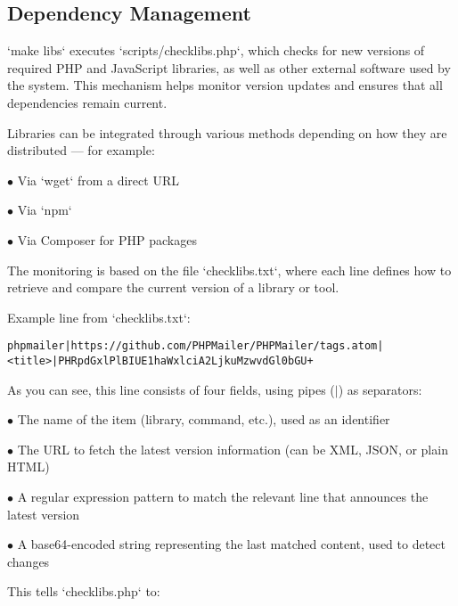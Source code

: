 \documentclass[a4paper]{article}
\begin{document}
\hypertarget{toc63}{}
\subsection{Dependency Management}

`make libs` executes `scripts/checklibs.php`, which checks for new versions of required PHP and JavaScript libraries, as well as other external software used by the system. This mechanism helps monitor version updates and ensures that all dependencies remain current.

Libraries can be integrated through various methods depending on how they are distributed — for example:

\begin{compactitem}
\item[\color{myblue}$\bullet$] Via `wget` from a direct URL
\item[\color{myblue}$\bullet$] Via `npm`
\item[\color{myblue}$\bullet$] Via Composer for PHP packages
\end{compactitem}

The monitoring is based on the file `checklibs.txt`, where each line defines how to retrieve and compare the current version of a library or tool.

Example line from `checklibs.txt`:

\begin{lstlisting}
phpmailer|https://github.com/PHPMailer/PHPMailer/tags.atom|<title>|PHRpdGxlPlBIUE1haWxlciA2LjkuMzwvdGl0bGU+
\end{lstlisting}

As you can see, this line consists of four fields, using pipes ($|$) as separators:

\begin{compactitem}
\item[\color{myblue}$\bullet$] The name of the item (library, command, etc.), used as an identifier
\item[\color{myblue}$\bullet$] The URL to fetch the latest version information (can be XML, JSON, or plain HTML)
\item[\color{myblue}$\bullet$] A regular expression pattern to match the relevant line that announces the latest version
\item[\color{myblue}$\bullet$] A base64-encoded string representing the last matched content, used to detect changes
\end{compactitem}

This tells `checklibs.php` to:
\end{document}
